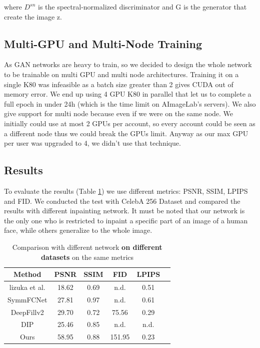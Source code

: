 \documentclass[10pt,twocolumn,letterpaper]{article}
\begin{document}
where \(D^{sn}\) is the spectral-normalized discriminator and G is the generator
that create the image z.

\subsection{Multi-GPU and Multi-Node Training}
As GAN networks are heavy to train, so we decided to design the whole network to be
trainable on multi GPU and multi node architectures. Training it on a single K80
was infeasible as a batch size greater than 2 gives CUDA out of memory error.
We end up using 4 GPU K80 in parallel that let us to complete a full epoch in
under 24h (which is the time limit on AImageLab's servers). We also give support
for multi node because even if we were on the same node. We initially could use
at most 2 GPUs per account, so every account could be seen as a different node
thus we could break the GPUs limit. Anyway as our max GPU per user was
upgraded to 4, we didn't use that technique.

\subsection{Results}
To evaluate the results (Table \ref{tab:results}) we use different metrics:
PSNR, SSIM, LPIPS and FID. We conducted the test with CelebA 256 Dataset and
compared the results with different inpainting network. It must be noted that
our network is the only one who is restricted to inpaint a specific part of an
image of a human face, while others generalize to the whole image.
\\
\begin{table}
  \begin{tabular}{|c|c|c|c|c|c|}
    \hline
    Method & PSNR & SSIM & FID & LPIPS \\
    \hline
    lizuka et al. \cite{iizuka2017globally} & 18.62 & 0.69 & n.d. & 0.51 \\
    SymmFCNet \cite{li2020learning}         & 27.81 & 0.97 & n.d. & 0.61 \\
    DeepFillv2 \cite{yu2019free}            & 29.70 & 0.72 & 75.56 & 0.29 \\
    DIP \cite{Ulyanov_2018_CVPR}            & 25.46 & 0.85 & n.d. & n.d. \\
    Ours                                    & 58.95 & 0.88 & 151.95 & 0.23\\
  \hline
  \end{tabular}
  \\
  \caption{Comparison with different network \textbf{on different datasets} on the same metrics}
  \label{tab:results}
\end{table}
\end{document}
